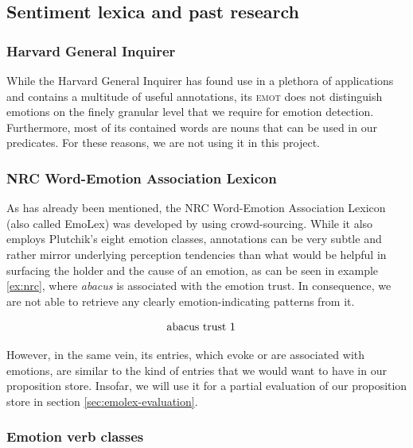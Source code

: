 \subsection{Sentiment lexica and past research}

\subsubsection{Harvard General Inquirer}

While the Harvard General Inquirer \cite{general_inquirer} has found use in a plethora of applications and contains a multitude of useful annotations, its \textsc{emot} does not distinguish emotions on the finely granular level that we require for emotion detection. Furthermore, most of its contained words are nouns that can be used in our predicates. For these reasons, we are not using it in this project.

\subsubsection{NRC Word-Emotion Association Lexicon} \label{sec:emolex}

As has already been mentioned, the NRC Word-Emotion Association Lexicon (also called EmoLex) was developed by \citeauthor{nrc_emolex} using crowd-sourcing. While it also employs Plutchik's eight emotion classes, annotations can be very subtle and rather mirror underlying perception tendencies than what would be helpful in surfacing the holder and the cause of an emotion, as can be seen in example \ref{ex:nrc}, where \textit{abacus} is associated with the emotion trust. In consequence, we are not able to retrieve any clearly emotion-indicating patterns from it.

\begin{align}
\begin{split}\label{ex:nrc}
&\textnormal{abacus	trust	1}
\end{split}
\end{align}

However, in the same vein, its entries, which evoke or are associated with emotions, are similar to the kind of entries that we would want to have in our proposition store. Insofar, we will use it for a partial evaluation of our proposition store in section \ref{sec:emolex-evaluation}.

\subsubsection{Emotion verb classes}

